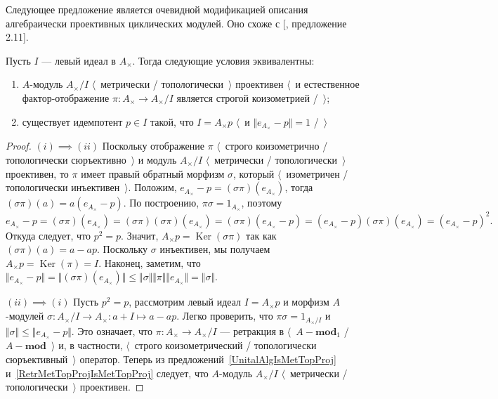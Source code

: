 Следующее предложение является очевидной модификацией описания алгебраически
проективных циклических модулей. Оно схоже с [\cite{WhiteInjmoduAlg},
предложение 2.11].

\begin{proposition}\label{MetTopProjCycModCharac} Пусть $I$ --- левый идеал в
$A_\times $. Тогда следующие условия эквивалентны:
\begin{enumerate}[label = (\roman*)]
    \item $A$-модуль $A_\times /I$ $\langle$~метрически /
    топологически~$\rangle$ проективен $\langle$~и естественное
    фактор-отображение $\pi:A_\times \to A_\times /I$ является строгой
    коизометрией /~$\rangle$;

    \item существует идемпотент $p\in I$ такой, что $I=A_\times  p$ $\langle$~и
    $\Vert e_{A_\times }-p\Vert= 1$ /~$\rangle$
\end{enumerate}
\end{proposition}
\begin{proof} $(i) \implies(ii)$ Поскольку отображение $\pi$ $\langle$~строго
коизометрично / топологически сюръективно~$\rangle$ и модуль $A_\times /I$
$\langle$~метрически / топологически~$\rangle$ проективен, то $\pi$ имеет правый
обратный морфизм $\sigma$, который $\langle$~изометричен / топологически
инъективен~$\rangle$. Положим, $e_{A_\times }-p=(\sigma\pi)(e_{A_\times })$,
тогда $(\sigma\pi)(a)=a(e_{A_\times }-p)$. По построению, 
$\pi\sigma=1_{A_\times }$, поэтому  
$$
e_{A_\times }-p
=(\sigma\pi)(e_{A_\times })
=(\sigma\pi)(\sigma\pi)(e_{A_\times })
=(\sigma\pi)(e_{A_\times }-p)
=(e_{A_\times }-p)(\sigma\pi)(e_{A_\times })
={(e_{A_\times }-p)}^2.
$$
Откуда следует, что $p^2=p$. Значит, $A_\times p=\operatorname{Ker}(\sigma\pi)$
так как $(\sigma\pi)(a)=a-ap$. Поскольку $\sigma$ инъективен, мы получаем
$A_\times p=\operatorname{Ker}(\pi)=I$. Наконец, заметим, что 
$\Vert e_{A_\times}-p\Vert
=\Vert(\sigma\pi)(e_{A_\times})\Vert
\leq\Vert\sigma\Vert\Vert\pi\Vert\Vert e_{A_\times }\Vert
=\Vert\sigma\Vert$.

$(ii) \implies(i)$ Пусть $p^2=p$, рассмотрим левый идеал $I=A_\times p$ и
морфизм $A$-модулей $\sigma:A_\times /I\to A_\times:a+I\mapsto a-ap$. Легко
проверить, что $\pi\sigma=1_{A_\times/I}$ и $\Vert\sigma\Vert\leq\Vert
e_{A_\times }-p\Vert$. Это означает, что $\pi:A_\times \to A_\times /I$ ---
ретракция в $\langle$~$A-\mathbf{mod}_1$ / $A-\mathbf{mod}$~$\rangle$ и, в
частности, $\langle$~строго коизометрический / топологически
сюръективный~$\rangle$ оператор. Теперь из
предложений~\ref{UnitalAlgIsMetTopProj} и~\ref{RetrMetTopProjIsMetTopProj}
следует, что $A$-модуль $A_\times /I$ $\langle$~метрически /
топологически~$\rangle$ проективен.
\end{proof} 

